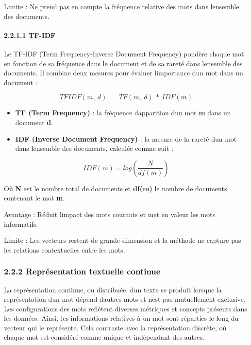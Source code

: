 \documentclass[
]{article}
\begin{document}
Limite : Ne prend pas en compte la fréquence relative des mots dans
l\textquotesingle ensemble des documents.

\paragraph{2.2.1.1 TF-IDF}\label{tf-idf}

Le TF-IDF (Term Frequency-Inverse Document Frequency) pondère chaque mot
en fonction de sa fréquence dans le document et de sa rareté dans
l\textquotesingle ensemble des documents. Il combine deux mesures pour
évaluer l\textquotesingle importance d\textquotesingle un mot dans un
document :

\[TFIDF(m,\ d)\  = \ TF(m,\ d)\ *\ IDF(m)\]

\begin{itemize}
\item
  \textbf{TF (Term Frequency)} : la fréquence
  d\textquotesingle apparition d\textquotesingle un mot \textbf{m} dans
  un document \textbf{d}.
\item
  \textbf{IDF (Inverse Document Frequency)} : la mesure de la rareté
  d\textquotesingle un mot dans l\textquotesingle ensemble des
  documents, calculée comme suit :
\end{itemize}

\[IDF(m) = log(\frac{N}{df(m)})\]

Où \textbf{N} est le nombre total de documents et \textbf{df(m)} le
nombre de documents contenant le mot \textbf{m}.

Avantage : Réduit l\textquotesingle impact des mots courants et met en
valeur les mots informatifs.

Limite : Les vecteurs restent de grande dimension et la méthode ne
capture pas les relations contextuelles entre les mots.

\subsubsection{2.2.2 Représentation textuelle
continue}\label{repruxe9sentation-textuelle-continue}

La représentation continue, ou distribuée, d\textquotesingle un texte se
produit lorsque la représentation d\textquotesingle un mot dépend
d\textquotesingle autres mots et n\textquotesingle est pas mutuellement
exclusive. Les configurations des mots reflètent diverses métriques et
concepts présents dans les données. Ainsi, les informations relatives à
un mot sont réparties le long du vecteur qui le représente. Cela
contraste avec la représentation discrète, où chaque mot est considéré
comme unique et indépendant des autres.
\end{document}
